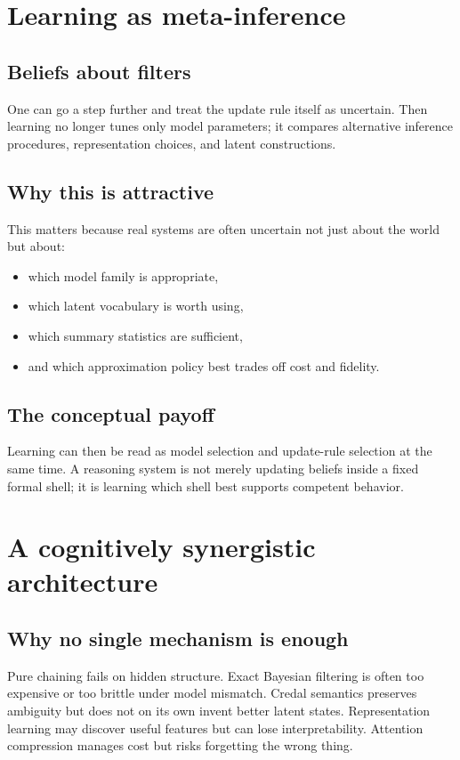 \documentclass[11pt]{article}
\begin{document}
\section{Learning as meta-inference}

\subsection{Beliefs about filters}

One can go a step further and treat the update rule itself as uncertain.  Then
learning no longer tunes only model parameters; it compares alternative
inference procedures, representation choices, and latent constructions.

\subsection{Why this is attractive}

This matters because real systems are often uncertain not just about the world
but about:
\begin{itemize}
  \item which model family is appropriate,
  \item which latent vocabulary is worth using,
  \item which summary statistics are sufficient,
  \item and which approximation policy best trades off cost and fidelity.
\end{itemize}

\subsection{The conceptual payoff}

Learning can then be read as model selection and update-rule selection at the
same time.  A reasoning system is not merely updating beliefs inside a fixed
formal shell; it is learning which shell best supports competent behavior.

\section{A cognitively synergistic architecture}

\subsection{Why no single mechanism is enough}

Pure chaining fails on hidden structure.  Exact Bayesian filtering is often too
expensive or too brittle under model mismatch.  Credal semantics preserves
ambiguity but does not on its own invent better latent states.  Representation
learning may discover useful features but can lose interpretability.  Attention
compression manages cost but risks forgetting the wrong thing.
\end{document}
